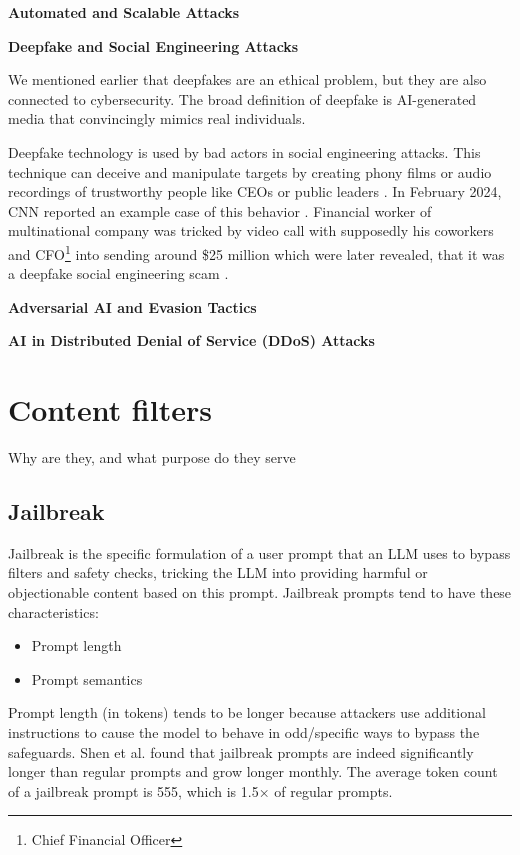 \textbf{Automated and Scalable Attacks}


\textbf{Deepfake and Social Engineering Attacks}

We mentioned earlier that deepfakes are an ethical problem, but they are also connected to cybersecurity. The broad definition of deepfake is AI-generated media that convincingly mimics real individuals.

Deepfake technology is used by bad actors in social engineering attacks. This technique can deceive and manipulate targets by creating phony films or audio recordings of trustworthy people like CEOs or public leaders \cite{Princess-Egbuna_2021}. In February 2024, CNN reported an example case of this behavior \cite{deepfake_CFO}. Financial worker of multinational company was tricked by video call with supposedly his coworkers and CFO\footnote{Chief Financial Officer} into sending around \$25 million which were later revealed, that it was a deepfake social engineering scam \cite{deepfake_CFO}.

\textbf{Adversarial AI and Evasion Tactics}

\textbf{AI in Distributed Denial of Service (DDoS) Attacks}


\section{Content filters}
Why are they, and what purpose do they serve

\subsection{Jailbreak}
Jailbreak is the specific formulation of a user prompt that an LLM uses to bypass filters and safety checks, tricking the LLM into providing harmful or objectionable content based on this prompt.
Jailbreak prompts tend to have these characteristics:
\begin{itemize}
    \item Prompt length
    \item Prompt semantics
\end{itemize}

Prompt length (in tokens) tends to be longer because attackers use additional instructions to cause the model to behave in odd/specific ways to bypass the safeguards.
Shen et al.\cite{shen2024donowcharacterizingevaluating} found that jailbreak prompts are indeed significantly longer than regular prompts and grow longer monthly. The average token count of a jailbreak prompt is 555, which is 1.5× of regular prompts.

